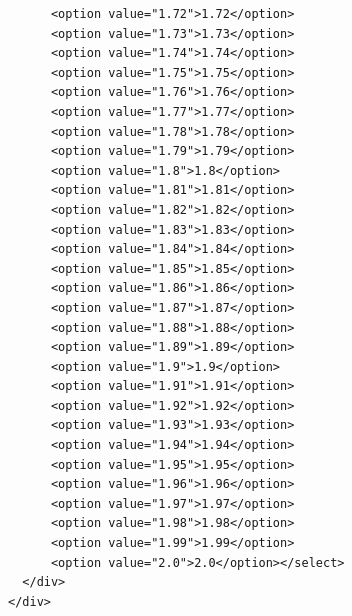 \documentclass[
  letterpaper,
  DIV=11,
  numbers=noendperiod]{scrartcl}
\begin{document}
\begin{verbatim}
      <option value="1.72">1.72</option>
      <option value="1.73">1.73</option>
      <option value="1.74">1.74</option>
      <option value="1.75">1.75</option>
      <option value="1.76">1.76</option>
      <option value="1.77">1.77</option>
      <option value="1.78">1.78</option>
      <option value="1.79">1.79</option>
      <option value="1.8">1.8</option>
      <option value="1.81">1.81</option>
      <option value="1.82">1.82</option>
      <option value="1.83">1.83</option>
      <option value="1.84">1.84</option>
      <option value="1.85">1.85</option>
      <option value="1.86">1.86</option>
      <option value="1.87">1.87</option>
      <option value="1.88">1.88</option>
      <option value="1.89">1.89</option>
      <option value="1.9">1.9</option>
      <option value="1.91">1.91</option>
      <option value="1.92">1.92</option>
      <option value="1.93">1.93</option>
      <option value="1.94">1.94</option>
      <option value="1.95">1.95</option>
      <option value="1.96">1.96</option>
      <option value="1.97">1.97</option>
      <option value="1.98">1.98</option>
      <option value="1.99">1.99</option>
      <option value="2.0">2.0</option></select>
  </div>
</div>
\end{verbatim}
\end{document}
